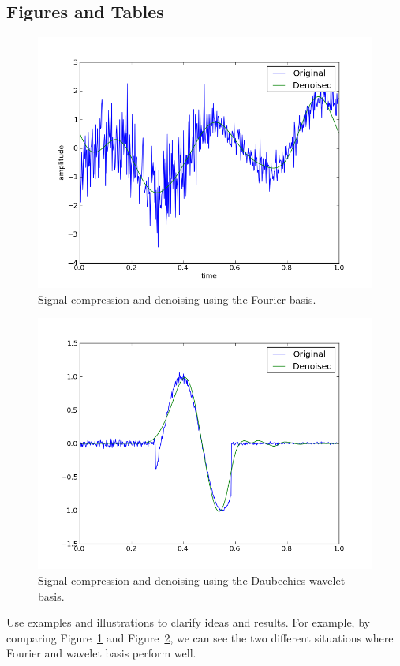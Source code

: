 \documentclass[10pt,conference,compsocconf]{IEEEtran}
\begin{document}
\subsection{Figures and Tables}

\begin{figure}[tbp]
  \centering
  \includegraphics[width=\columnwidth]{denoised_signal_1d}
  \caption{Signal compression and denoising using the Fourier basis.}
  \vspace{-3mm}
  \label{fig:denoise-fourier}
\end{figure}
\begin{figure}[htbp]
  \centering
  \includegraphics[width=\columnwidth]{local_wdenoised_1d}
  \vspace{-3mm}
  \caption{Signal compression and denoising using the Daubechies wavelet basis.}
  \label{fig:denoise-wavelet}
\end{figure}

Use examples and illustrations to clarify ideas and results. For
example, by comparing Figure~\ref{fig:denoise-fourier} and
Figure~\ref{fig:denoise-wavelet}, we can see the two different
situations where Fourier and wavelet basis perform well. 







\end{document}
